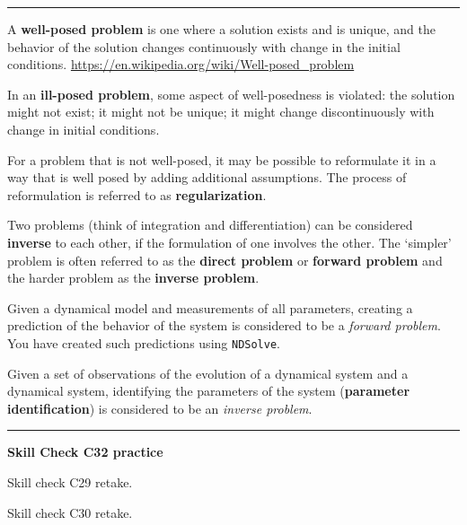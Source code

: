 \documentclass[12pt,letterpaper,noanswers]{exam}
\begin{document}
\vspace{0.2cm}
\hrule
\vspace{0.2cm}
\begin{tcolorbox}
A \textbf{well-posed problem} is one where a solution exists and is unique, and the behavior of the solution changes continuously with change in the initial conditions.  \url{https://en.wikipedia.org/wiki/Well-posed_problem}

In an \textbf{ill-posed problem}, some aspect of well-posedness is violated: the solution might not exist; it might not be unique; it might change discontinuously with change in initial conditions.

For a problem that is not well-posed, it may be possible to reformulate it in a way that is well posed by adding additional assumptions.  The process of reformulation is referred to as \textbf{regularization}.
\end{tcolorbox}

\begin{tcolorbox}
Two problems (think of integration and differentiation) can be considered \textbf{inverse} to each other, if the formulation of one involves the other.  The `simpler' problem is often referred to as the \textbf{direct problem} or \textbf{forward problem} and the harder problem as the \textbf{inverse problem}.

Given a dynamical model and measurements of all parameters, creating a prediction of the behavior of the system is considered to be a \emph{forward problem}.  You have created such predictions using \texttt{NDSolve}.

Given a set of observations of the evolution of a dynamical system and a dynamical system, identifying the parameters of the system (\textbf{parameter identification}) is considered to be an \emph{inverse problem}.
\end{tcolorbox}

\vspace{0.2cm}
\hrule
\vspace{0.2cm}

\noindent\textbf{Skill Check C32 practice}
\begin{questions}
\item Skill check C29 retake.

\item Skill check C30 retake.
\end{questions}

\vspace{0.2cm}
\end{document}
